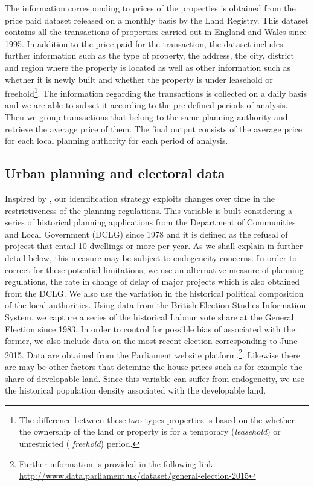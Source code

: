 \documentclass[12pt,letterpaper]{article}
\begin{document}
  The information corresponding to prices of the properties is obtained from the price paid dataset
    released on a monthly basis by the Land Registry. This dataset contains all the transactions of
     properties carried out in England and Wales since 1995. In addition to the price paid for the transaction,
    the dataset includes further information such as the type of property, the address, the city, district
     and region where the property is located as well as other information such as whether it is newly built
     and whether the property is under leasehold or freehold\footnote{The difference between these two types properties is based on 
     the whether the ownership of the land or property is for a temporary (\textit{leasehold}) or unrestricted ( \textit{freehold}) period. }. 
     The information regarding the transactions is
     collected on a daily basis and we are able to subset it according to the pre-defined periods of
     analysis. Then we group transactions that belong to the same planning authority and retrieve the average 
     price of them. The final output consists of the average price for each local planning authority for each
    period of analysis. 
        
  \subsection{Urban planning and electoral data}
    Inspired by \citet{hilber2016supply}, our identification strategy exploits changes over time in the restrictiveness of the 
planning regulations. This variable is built considering a series of historical
  planning applications from the Department of Communities and Local Government (DCLG) 
  since 1978 and it is defined as the refusal of projecst that entail 10 dwellings or more per year. 
  As we shall explain in further detail 
    below, this measure may be subject to endogeneity concerns. In order to correct for 
    these potential limitations, we use an alternative measure 
    of planning regulations, the rate in change of delay of major projects which is also obtained from the DCLG. We
    also use the variation in the historical 
    political composition of the local authorities. Using data from the British Election Studies Information System, 
    we capture a series of the historical Labour vote share at the General Election since 1983. 
    In order to control for possible bias of associated with the former, we 
    also include data on the most recent election corresponding to June 2015. 
    Data are obtained from the Parliament website platform.\footnote{Further information is provided 
     in the following link: \href{http://www.data.parliament.uk/dataset/general-election-2015}{http://www.data.parliament.uk/dataset/general-election-2015}}.
     Likewise there are may be other factors that detemine the house prices such as for example the share
     of developable land. Since this variable can suffer from endogeneity, we use the historical population density 
     associated with the developable land. 
    
\end{document}

